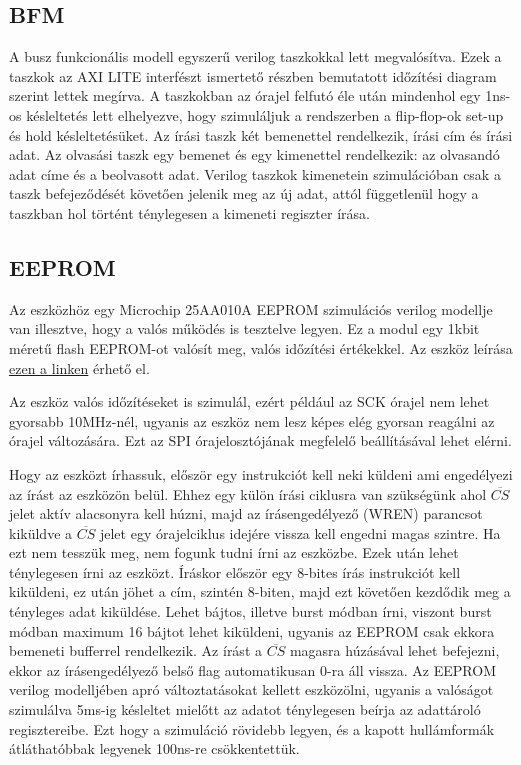 \documentclass[a4paper,11pt]{article}
\begin{document}
\subsection{BFM}

A busz funkcionális modell egyszerű verilog taszkokkal lett megvalósítva. Ezek a taszkok az AXI LITE interfészt ismertető részben bemutatott időzítési diagram szerint lettek megírva. A taszkokban az órajel felfutó éle után mindenhol egy 1ns-os késleltetés lett elhelyezve, hogy szimuláljuk a rendszerben a flip-flop-ok set-up és hold késleltetésüket. Az írási taszk két bemenettel rendelkezik, írási cím és írási adat. Az olvasási taszk egy bemenet és egy kimenettel rendelkezik: az olvasandó adat címe és a beolvasott adat. Verilog taszkok kimenetein szimulációban csak a taszk befejeződését követően jelenik meg az új adat, attól függetlenül hogy a taszkban hol történt ténylegesen a kimeneti regiszter írása.

\subsection{EEPROM}
Az eszközhöz egy Microchip 25AA010A EEPROM szimulációs verilog modellje van illesztve, hogy a valós működés is tesztelve legyen. Ez a modul egy 1kbit méretű flash EEPROM-ot valósít meg, valós időzítési értékekkel. Az eszköz leírása \href{http://ww1.microchip.com/downloads/en/DeviceDoc/21832H.pdf}{ezen a linken} érhető el.

Az eszköz valós időzítéseket is szimulál, ezért például az SCK órajel nem lehet gyorsabb 10MHz-nél, ugyanis az eszköz nem lesz képes elég gyorsan reagálni az órajel változására. Ezt az SPI órajelosztójának megfelelő beállításával lehet elérni.

Hogy az eszközt írhassuk, először egy instrukciót kell neki küldeni ami engedélyezi az írást az eszközön belül. Ehhez egy külön írási ciklusra van szükségünk ahol $\overline{CS}$ jelet aktív alacsonyra kell húzni, majd az írásengedélyező (WREN) parancsot kiküldve a $\overline{CS}$ jelet egy órajelciklus idejére vissza kell engedni magas szintre. Ha ezt nem tesszük meg, nem fogunk tudni írni az eszközbe. Ezek után lehet ténylegesen írni az eszközt. Íráskor először egy 8-bites írás instrukciót kell kiküldeni, ez után jöhet a cím, szintén 8-biten, majd ezt követően kezdődik meg a tényleges adat kiküldése. Lehet bájtos, illetve burst módban írni, viszont burst módban maximum 16 bájtot lehet kiküldeni, ugyanis az EEPROM csak ekkora bemeneti bufferrel rendelkezik. Az írást a $\overline{CS}$ magasra húzásával lehet befejezni, ekkor az írásengedélyező belső flag automatikusan 0-ra áll vissza. Az EEPROM verilog modelljében apró változtatásokat kellett eszközölni, ugyanis a valóságot szimulálva 5ms-ig késleltet mielőtt az adatot ténylegesen beírja az adattároló regisztereibe. Ezt hogy a szimuláció rövidebb legyen, és a kapott hullámformák átláthatóbbak legyenek 100ns-re csökkentettük.
\end{document}
